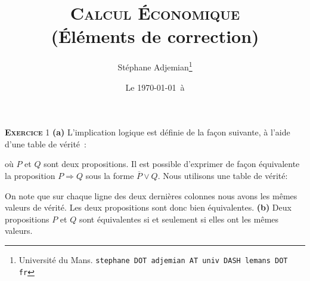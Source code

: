 \documentclass[10pt,a4paper,notitlepage]{article}
\newcommand{\exercice}[1]{\textsc{\textbf{Exercice}} #1}
\begin{document}
\title{\textsc{Calcul Économique}\\\textbf{(Éléments de correction)}}
\author{Stéphane Adjemian\thanks{Université du Mans. \texttt{stephane DOT adjemian AT univ DASH lemans DOT fr}}}
\date{Le \today\ à \thistime}

\maketitle

\exercice{1} \textbf{(a)} L'implication logique est définie de la façon suivante, à l'aide d'une table de vérité :
\begin{table}[H]
  \centering
{}
\end{table}
où $P$ et $Q$ sont deux propositions. Il est possible d'exprimer de
façon équivalente la proposition $P\Rightarrow Q$ sous la forme
$\overline P \lor Q$. Nous utilisons une table de vérité:
\begin{table}[H]
  \centering
{}
\end{table}
On note que sur chaque ligne des deux dernières colonnes nous avons
les mêmes valeurs de vérité. Les deux propositions sont donc bien
équivalentes. \textbf{(b)} Deux propositions $P$ et $Q$ sont
équivalentes si et seulement si elles ont les mêmes valeurs.
\begin{table}[H]
  \centering
{}
\end{table}
\end{document}
